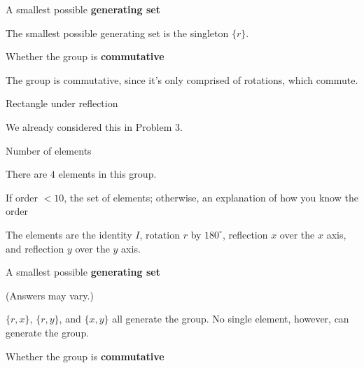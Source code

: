 \documentclass[../key.tex]{subfiles}
\begin{document}
\begin{inner_problem}
\item A smallest possible \textbf{generating set}
\end{inner_problem}

\noindent The smallest possible generating set is the singleton $\{r\}$.

\begin{inner_problem}
\item Whether the group is \textbf{commutative}
\end{inner_problem}

\noindent The group is commutative, since it's only comprised of rotations, which commute.

\begin{outer_problem}
\item Rectangle under reflection
\end{outer_problem}

\noindent We already considered this in Problem 3.

\begin{inner_problem}[start=1]
\item Number of elements
\end{inner_problem}

\noindent There are $4$ elements in this group.

\begin{inner_problem}
\item If order $< 10$, the set of elements; otherwise, an explanation of how you know the order
\end{inner_problem}

\noindent The elements are the identity $I$, rotation $r$ by $180^\circ$, reflection $x$ over the $x$ axis, and reflection $y$ over the $y$ axis.

\begin{inner_problem}
\item A smallest possible \textbf{generating set}
\end{inner_problem}

\noindent (Answers may vary.)

$\{r,x\}$, $\{r,y\}$, and $\{x,y\}$ all generate the group. No single element, however, can generate the group.

\begin{inner_problem}
\item Whether the group is \textbf{commutative}
\end{inner_problem}
\end{document}
